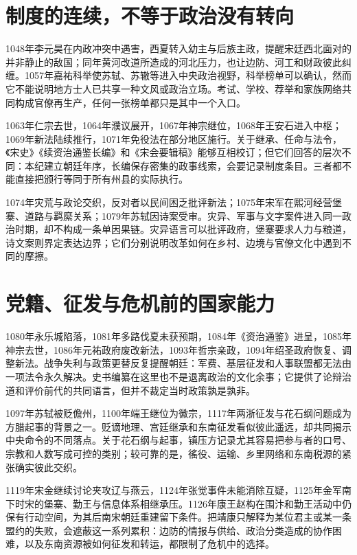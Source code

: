\section{制度的连续，不等于政治没有转向}

1048年李元昊在内政冲突中遇害，西夏转入幼主与后族主政，提醒宋廷西北面对的并非静止的敌国；同年黄河改道所造成的河北压力，也让边防、河工和财政彼此纠缠。1057年嘉祐科举使苏轼、苏辙等进入中央政治视野，科举榜单可以确认，然而它不能说明地方士人已共享一种文风或政治立场。考试、学校、荐举和家族网络共同构成官僚再生产，任何一张榜单都只是其中一个入口。

1063年仁宗去世，1064年濮议展开，1067年神宗继位，1068年王安石进入中枢；1069年新法陆续推行，1071年免役法在部分地区施行。关于继承、任命与法令，《宋史》《续资治通鉴长编》和《宋会要辑稿》能够互相校订；但它们回答的层次不同：本纪建立朝廷年序，长编保存密集的政事线索，会要记录制度条目。三者都不能直接把颁行等同于所有州县的实际执行。

1074年灾荒与政论交织，反对者以民间困乏批评新法；1075年宋军在熙河经营堡寨、道路与羁縻关系；1079年苏轼因诗案受审。灾异、军事与文字案件进入同一政治时期，却不构成一条单因果链。灾异语言可以批评政府，堡寨要求人力与粮道，诗文案则界定表达边界；它们分别说明改革如何在乡村、边境与官僚文化中遇到不同的摩擦。

\section{党籍、征发与危机前的国家能力}

1080年永乐城陷落，1081年多路伐夏未获预期，1084年《资治通鉴》进呈，1085年神宗去世，1086年元祐政府废改新法，1093年哲宗亲政，1094年绍圣政府恢复、调整新法。战争失利与政策更替反复提醒朝廷：军费、基层征发和人事联盟都无法由一项法令永久解决。史书编纂在这里也不是退离政治的文化余事；它提供了论辩治道和评价前代的共同语言，但并不裁定当时政策孰是孰非。

1097年苏轼被贬儋州，1100年端王继位为徽宗，1117年两浙征发与花石纲问题成为方腊起事的背景之一。贬谪地理、宫廷继承和东南征发看似彼此遥远，却共同揭示中央命令的不同落点。关于花石纲与起事，镇压方记录尤其容易把参与者的口号、宗教和人数写成可控的类别；较可靠的是，徭役、运输、乡里网络和东南税源的紧张确实彼此交织。

1119年宋金继续讨论夹攻辽与燕云，1124年张觉事件未能消除互疑，1125年金军南下时宋的堡寨、勤王与信息体系相继承压。1126年康王赵构在围汴和勤王活动中仍保有行动空间，为其后南宋朝廷重建留下条件。把靖康只解释为某位君主或某一条盟约的失败，会遮蔽这一系列累积：边防的情报与供给、政治分类造成的协作困难，以及东南资源被如何征发和转运，都限制了危机中的选择。
